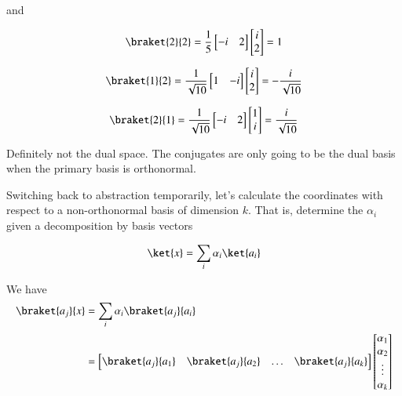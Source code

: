 and 

\begin{align*}
\braket{2}{2} = 
\inv{5}
\begin{bmatrix}
-i & 2 
\end{bmatrix}
\begin{bmatrix}
i \\
2
\end{bmatrix}
= 1
\end{align*}

\begin{align*}
\braket{1}{2} = 
\inv{\sqrt{10}}
\begin{bmatrix}
1 & -i
\end{bmatrix}
\begin{bmatrix}
i \\
2
\end{bmatrix}
= -\frac{i}{\sqrt{10}}
\end{align*}

\begin{align*}
\braket{2}{1} = 
\inv{\sqrt{10}}
\begin{bmatrix}
-i & 2
\end{bmatrix}
\begin{bmatrix}
1 \\
i
\end{bmatrix}
= \frac{i}{\sqrt{10}}
\end{align*}

Definitely not the dual space.  The conjugates are only going to be the dual basis when the primary basis is orthonormal.

Switching back to abstraction temporarily, let's calculate the coordinates with respect to a non-orthonormal
basis of dimension $k$.  That is, determine the $\alpha_i$ given a decomposition by basis vectors

\begin{align*}
\ket{x} = \sum_i \alpha_i \ket{a_i}
\end{align*}

We have 
\begin{align*}
\braket{a_j}{x} 
&= \sum_i \alpha_i \braket{a_j}{a_i} \\
&=
\begin{bmatrix}
\braket{a_j}{a_1} & \braket{a_j}{a_2} & \hdots & \braket{a_j}{a_k}
\end{bmatrix}
\begin{bmatrix}
\alpha_1 \\
\alpha_2 \\
\vdots \\
\alpha_k \\
\end{bmatrix}
\end{align*}

